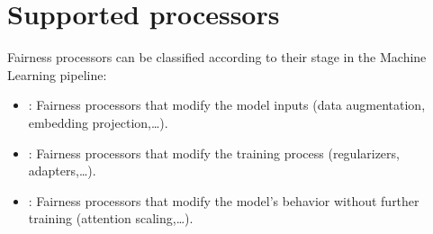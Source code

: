 \documentclass[letterpaper,10pt,english]{sphinxmanual}
\begin{document}
\section{Supported processors}
\label{\detokenize{algorithms:supported-processors}}
\sphinxAtStartPar
Fairness processors can be classified according to their stage in the Machine Learning pipeline:
\begin{itemize}
\item {} 
\sphinxAtStartPar
{}: Fairness processors that modify the model inputs (data augmentation, embedding projection,…).

\item {} 
\sphinxAtStartPar
{}: Fairness processors that modify the training process (regularizers, adapters,…).

\item {} 
\sphinxAtStartPar
{}: Fairness processors that modify the model’s behavior without further training (attention scaling,…).

\end{itemize}
\end{document}
